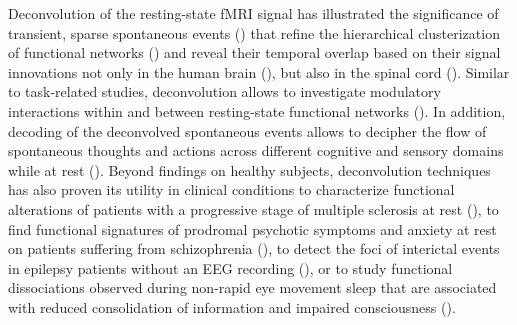 Deconvolution of the resting-state fMRI signal has illustrated the significance of transient, sparse spontaneous events (\citealt{Petridou2012PeriodsrestfMRI,Allan2015FunctionalConnectivityMRI}) that refine the hierarchical clusterization of functional networks (\citealt{Karahanoglu2013TotalactivationfMRI}) and reveal their temporal overlap based on their signal innovations not only in the human brain (\citealt{Karahanoglu2015Transientbrainactivity}), but also in the spinal cord (\citealt{kinany2020DynamicFunctionalConnectivity}). Similar to task-related studies, deconvolution allows to investigate modulatory interactions within and between resting-state functional networks (\citealt{Di2013ModulatoryInteractionsResting,Di2015Characterizationsrestingstate}). In addition, decoding of the deconvolved spontaneous events allows to decipher the flow of spontaneous thoughts and actions across different cognitive and sensory domains while at rest (\citealt{Karahanoglu2015Transientbrainactivity,GonzalezCastillo2019Imagingspontaneousflow,Tan2017}). Beyond findings on healthy subjects, deconvolution techniques has also proven its utility in clinical conditions to characterize functional alterations of patients with a progressive stage of multiple sclerosis at rest (\citealt{Bommarito2020Alteredanteriordefault}), to find functional signatures of prodromal psychotic symptoms and anxiety at rest on patients suffering from schizophrenia (\citealt{Zoeller2019Largescalebrain}), to detect the foci of interictal events in epilepsy patients without an EEG recording (\citealt{Lopes2012Detectionepilepticactivity,Karahanoglu2013Spatialmappinginterictal}), or to study functional dissociations observed during non-rapid eye movement sleep that are associated with reduced consolidation of information and impaired consciousness (\citealt{Tarun2020NREMsleepstages}).

